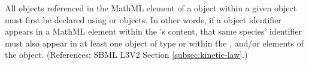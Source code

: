 All \Species objects referenced in the MathML  element of a
\KineticLaw object within a given \Reaction object must first be declared
using \SpeciesReference or \ModifierSpeciesReference objects.  In other
words, if a \Species object identifier appears in a MathML 
element within the \Reaction's \KineticLaw {} content, that same
species' identifier must also appear in at least one object of type
\SpeciesReference or \ModifierSpeciesReference within the
,  and/or
 elements of the \Reaction object.  (References:
SBML L3V2 Section \ref{subsec:kinetic-law}.)
